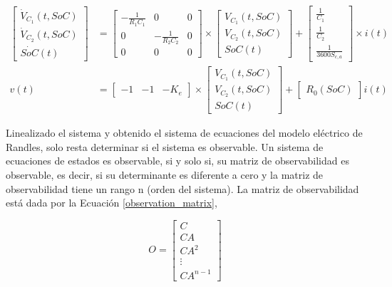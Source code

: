 \documentclass[10pt,a4paper]{article}
\newcounter{subsubsubsection}[subsubsection]
\begin{document}
\begin{align}
    \begin{bmatrix}
        \dot{V}_{C_1}(t, SoC) \\ \dot{V}_{C_2}(t, SoC) \\ \dot{SoC}(t)
    \end{bmatrix} &= 
    \begin{bmatrix}
        -\frac{1}{R_1C_1} & 0 & 0\\
        0 & -\frac{1}{R_2C_2} & 0\\
        0 & 0 & 0
    \end{bmatrix}
    \times\begin{bmatrix}V_{C_1}(t, SoC) \\ V_{C_2}(t, SoC) \\ SoC(t)\end{bmatrix}
    +
    \begin{bmatrix}
        \frac{1}{C_1} \\ \frac{1}{C_2} \\ \frac{1}{3600S_{c,a}}
    \end{bmatrix}
    \times i(t)\nonumber \\
    v(t) &= \begin{bmatrix} -1 & -1 & -K_e \end{bmatrix} \times 
    \begin{bmatrix} V_{C_1}(t, SoC) \\ V_{C_2}(t, SoC) \\ SoC(t) \end{bmatrix} +
    \begin{bmatrix} R_0(SoC) \end{bmatrix} i(t)\label{ss_randles_complete}
\end{align}

\newpage


Linealizado el sistema y obtenido el sistema de ecuaciones del modelo
el\'ectrico de Randles, solo resta determinar si el sistema es observable. Un
sistema de ecuaciones de estados es observable, si y solo si, su matriz de
observabilidad es observable, es decir, si su determinante es diferente a cero y
la matriz de observabilidad tiene un rango n (orden del sistema). La matriz de 
observabilidad est\'a dada por la Ecuaci\'on \ref{observation_matrix},

\begin{equation}
    O = \begin{bmatrix}
        C\\
        CA\\
        CA^2\\
        \vdots\\
        CA^{n-1}
        \end{bmatrix}\label{observation_matrix}
\end{equation}
\end{document}
